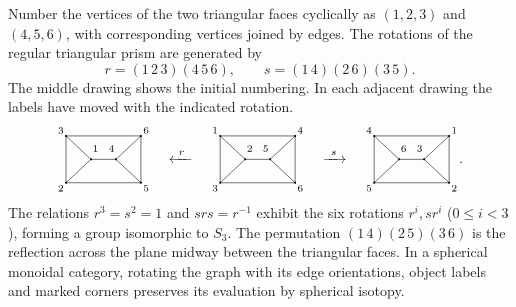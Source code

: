 \documentclass{amsart}
\begin{document}
\begin{remark} \label{rk:SymTP}
Number the vertices of the two triangular faces cyclically as $(1,2,3)$ and $(4,5,6)$, with corresponding vertices joined by edges. The rotations of the regular triangular prism are generated by
\[
 r=(1\,2\,3)(4\,5\,6),\qquad s=(1\,4)(2\,6)(3\,5).
\]
The middle drawing shows the initial numbering. In each adjacent drawing the
labels have moved with the indicated rotation.
\newcommand{\numberedprism}[6]{%
 \begin{tikzpicture}[baseline=5mm,x=6.3mm,y=5.9mm,
                      every node/.style={font=\scriptsize,inner sep=1.5pt}]
 \draw (0,2)--(1,1)--(0,0)--cycle (3,2)--(2,1)--(3,0)--cycle;
 \draw (0,2)--(3,2) (1,1)--(2,1) (0,0)--(3,0);
 \foreach \p in {(0,2),(1,1),(0,0),(3,2),(2,1),(3,0)}
   \fill \p circle[radius=.7pt];
 \node[above left] at (0,2) {$#1$}; \node at (1.18,1.46) {$#2$};
 \node[below left] at (0,0) {$#3$}; \node[above right] at (3,2) {$#4$};
 \node at (1.82,1.46) {$#5$}; \node[below right] at (3,0) {$#6$};
 \end{tikzpicture}}
\[
 \numberedprism{3}{1}{2}{6}{4}{5}
 \quad\xleftarrow{\ r\ }\quad
 \numberedprism{1}{2}{3}{4}{5}{6}
 \quad\xrightarrow{\ s\ }\quad
 \numberedprism{4}{6}{5}{1}{3}{2}.
\]
The relations $r^3=s^2=1$ and $srs=r^{-1}$ exhibit the six rotations
$r^i,sr^i$ ($0\le i<3$), forming a group isomorphic to $S_3$.
The permutation $(1\,4)(2\,5)(3\,6)$ is the reflection across the plane midway between
the triangular faces. In a spherical monoidal category, rotating the
graph with its edge orientations, object labels and marked corners
preserves its evaluation by spherical isotopy.
\end{remark}
\end{document}

